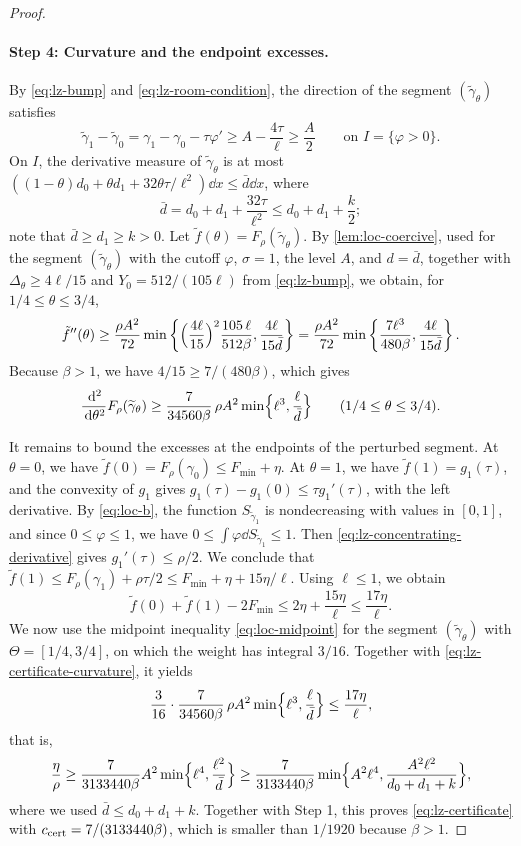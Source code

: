 \begin{proof}
\paragraph{Step 4: Curvature and the endpoint excesses.}
By \eqref{eq:lz-bump} and \eqref{eq:lz-room-condition}, the direction of the
segment $(\widetilde\gamma_\theta)$ satisfies
\[
 \widetilde\gamma_1-\widetilde\gamma_0=\gamma_1-\gamma_0-\tau\varphi'
 \ge A-\frac{4\tau}\ell\ge\frac A2\qquad\text{on }I=\{\varphi>0\}.
\]
On $I$, the derivative measure of $\widetilde\gamma_\theta$ is at most
$((1-\theta)d_0+\theta d_1+32\theta\tau/\ell^2)\dd x\le\bar d\dd x$, where
\[
 \bar d=d_0+d_1+\frac{32\tau}{\ell^2}\le d_0+d_1+\frac k2 ;
\]
note that $\bar d\ge d_1\ge k>0$. Let
$\tilde f(\theta)=F_\rho(\widetilde\gamma_\theta)$. By \cref{lem:loc-coercive},
used for the segment $(\widetilde\gamma_\theta)$ with the cutoff $\varphi$,
$\sigma=1$, the level $A$, and $d=\bar d$, together with
$\Delta_\theta\ge4\ell/15$ and $Y_0=512/(105\ell)$ from \eqref{eq:lz-bump}, we
obtain, for $1/4\le\theta\le3/4$,
\[
 \tilde f''(\theta)\ge\frac{\rho A^2}{72}
 \min\left\{\Bigl(\frac{4\ell}{15}\Bigr)^2\frac{105\,\ell}{512\beta},
 \frac{4\ell}{15\bar d}\right\}
 =\frac{\rho A^2}{72}\min\left\{\frac{7\ell^3}{480\beta},
 \frac{4\ell}{15\bar d}\right\}.
\]
Because $\beta>1$, we have $4/15\ge7/(480\beta)$, which gives
\begin{equation}\label{eq:lz-certificate-curvature}
 \frac{\,\mathrm d^2}{\,\mathrm d\theta^2}F_\rho(\widetilde\gamma_\theta)
 \ge\frac7{34560\beta}\,\rho A^2\min\Bigl\{\ell^3,\frac\ell{\bar d}\Bigr\}
 \qquad(1/4\le\theta\le3/4).
\end{equation}

It remains to bound the excesses at the endpoints of the perturbed segment.
At $\theta=0$, we have $\tilde f(0)=F_\rho(\gamma_0)\le F_{\min}+\eta$. At
$\theta=1$, we have $\tilde f(1)=g_1(\tau)$, and the convexity of $g_1$ gives
$g_1(\tau)-g_1(0)\le\tau g_1'(\tau)$, with the left derivative. By
\eqref{eq:loc-b}, the function $S_{\widetilde\gamma_1}$ is nondecreasing with
values in $[0,1]$, and since $0\le\varphi\le1$, we have
$0\le\int\varphi\dd S_{\widetilde\gamma_1}\le1$. Then
\eqref{eq:lz-concentrating-derivative} gives $g_1'(\tau)\le\rho/2$. We
conclude that $\tilde f(1)\le F_\rho(\gamma_1)+\rho\tau/2\le F_{\min}+\eta+15\eta/\ell$.
Using $\ell\le1$, we obtain
\[
 \tilde f(0)+\tilde f(1)-2F_{\min}\le2\eta+\frac{15\eta}\ell
 \le\frac{17\eta}\ell .
\]
We now use the midpoint inequality \eqref{eq:loc-midpoint} for the segment
$(\widetilde\gamma_\theta)$ with $\Theta=[1/4,3/4]$, on which the weight has
integral $3/16$. Together with \eqref{eq:lz-certificate-curvature}, it yields
\[
 \frac3{16}\cdot\frac7{34560\beta}\,\rho A^2
 \min\Bigl\{\ell^3,\frac\ell{\bar d}\Bigr\}\le\frac{17\eta}\ell,
\]
that is,
\[
 \frac\eta\rho\ge\frac7{3133440\beta}A^2\min\Bigl\{\ell^4,\frac{\ell^2}{\bar d}\Bigr\}
 \ge\frac7{3133440\beta}\min\Bigl\{A^2\ell^4,\frac{A^2\ell^2}{d_0+d_1+k}\Bigr\},
\]
where we used $\bar d\le d_0+d_1+k$. Together with Step 1, this proves
\eqref{eq:lz-certificate} with $c_{\rm cert}=7/(3133440\beta)$, which is
smaller than $1/1920$ because $\beta>1$.
\end{proof}

